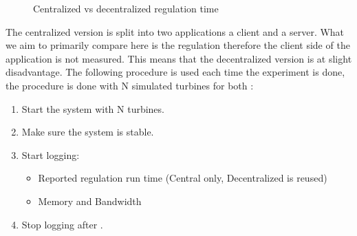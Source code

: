 \begin{figure}[b]
	\centering
	{}
	
	\newline
	
	{}
	
	\caption{Centralized vs decentralized regulation time}
	\label{fig:timingCentralVSDecentral}
\end{figure}

	The centralized version is split into two applications a client and a server.
	What we aim to primarily compare here is the regulation therefore the client side of the application is not measured. This means that the decentralized version is at slight disadvantage.
	The following procedure is used each time the experiment is done, the procedure is done with N simulated turbines for both :

\begin{minipage}{\textwidth}
	\begin{enumerate}
		\item Start the system with N turbines.
		\item Make sure the system is stable.
		\item Start logging:
		\begin{itemize}
			\item Reported regulation run time (Central only, Decentralized is reused)
			\item Memory and Bandwidth
		\end{itemize}
		\item Stop logging after \experiemntRunTime.
		\end{enumerate}
\end{minipage}
